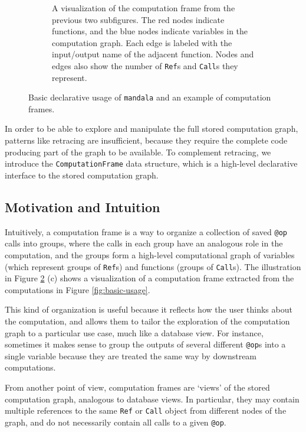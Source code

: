 \begin{figure}[htbp]
\begin{minipage}[b]{0.45\textwidth}
\begin{subfigure}[b]{\textwidth}
            \caption{A visualization of the computation frame from the previous
            two subfigures. The red nodes indicate functions, and the blue nodes
            indicate variables in the computation graph. Each edge is labeled
            with the input/output name of the adjacent function. Nodes and edges
            also show the number of \texttt{Ref}s and \texttt{Call}s they
            represent.}
            \label{fig:figure3}
        \end{subfigure}
    \end{minipage}
    \caption{Basic declarative usage of \texttt{mandala} and an example of
computation frames.}
    \label{fig:cf}
\end{figure}

In order to be able to explore and manipulate the full stored computation graph,
patterns like retracing are insufficient, because they require the complete code
producing part of the graph to be available. To complement retracing, we
introduce the \texttt{ComputationFrame} data structure, which is a high-level
declarative interface to the stored computation graph.

\subsection{Motivation and Intuition}
\label{subsection:cf-motivation-intuition}

Intuitively, a computation frame is a way to organize a collection of saved
\texttt{@op} calls into groups, where the calls in each group have an analogous
role in the computation, and the groups form a high-level computational graph of
variables (which represent groups of \texttt{Ref}s) and functions (groups of
\texttt{Call}s). The illustration in Figure \ref{fig:cf} (c) shows a
visualization of a computation frame extracted from the computations in Figure
\ref{fig:basic-usage}.

This kind of organization is useful because it reflects how the user thinks
about the computation, and allows them to tailor the exploration of the
computation graph to a particular use case, much like a database view. For
instance, sometimes it makes sense to group the outputs of several different
\texttt{@op}s into a single variable because they are treated the same way by
downstream computations.

From another point of view, computation frames are `views' of the stored
computation graph, analogous to database views. In particular, they may contain
multiple references to the same \texttt{Ref} or \texttt{Call} object from
different nodes of the graph, and do not necessarily contain all calls to a
given \texttt{@op}.

